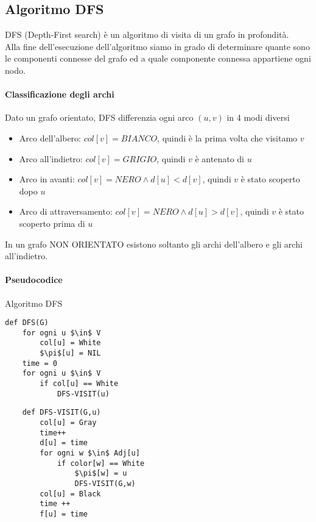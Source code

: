 

\subsection{Algoritmo DFS}
DFS (Depth-First search) è un algoritmo di visita di un grafo in profondità.
\\Alla fine dell'esecuzione dell'algoritmo siamo in grado di determinare quante sono le componenti connesse
del grafo ed a quale componente connessa appartiene ogni nodo.

\paragraph{Classificazione degli archi}
Dato un grafo orientato, DFS differenzia ogni arco $(u,v)$ in 4 modi diversi
\begin{itemize}
	\item Arco dell'albero: $col[v] = BIANCO$, quindi è la prima volta che visitamo $v$
	\item Arco all'indietro: $col[v] = GRIGIO$, quindi $v$ è antenato di $u$
	\item Arco in avanti: $col[v] = NERO \land d[u] < d[v]$, quindi $v$ è stato scoperto dopo $u$
	\item Arco di attraversamento: $col[v] = NERO \land d[u] > d[v]$, quindi $v$ è stato scoperto prima di $u$
\end{itemize}
In un grafo NON ORIENTATO esistono soltanto gli archi dell'albero e gli archi all'indietro.

\paragraph{Pseudocodice} Algoritmo DFS
\begin{lstlisting}
def DFS(G)
    for ogni u $\in$ V
        col[u] = White
        $\pi$[u] = NIL
    time = 0
    for ogni u $\in$ V
        if col[u] == White
            DFS-VISIT(u)
\end{lstlisting}
\begin{lstlisting}
	def DFS-VISIT(G,u)
		col[u] = Gray
		time++
		d[u] = time
		for ogni w $\in$ Adj[u]
			if color[w] == White
				$\pi$[w] = u
				DFS-VISIT(G,w)
		col[u] = Black
		time ++
		f[u] = time    
\end{lstlisting}

